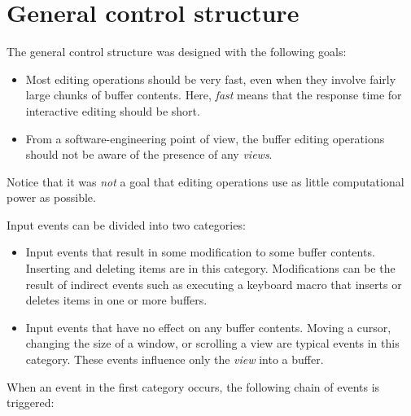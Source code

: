 \chapter{General control structure}
\label{chap-internals-control-structure}

The general control structure was designed with the following goals: 

\begin{itemize}
\item Most editing operations should be very fast, even when they
  involve fairly large chunks of buffer contents.  Here, \emph{fast}
  means that the response time for interactive editing should be
  short. 
\item From a software-engineering point of view, the buffer editing
  operations should not be aware of the presence of any \emph{views}. 
\end{itemize}

Notice that it was \emph{not} a goal that editing operations use as
little computational power as possible.  

Input events can be divided into two categories:

\begin{itemize}
\item Input events that result in some modification to some buffer
  contents.  Inserting and deleting items are in this category.
  Modifications can be the result of indirect events such as executing
  a keyboard macro that inserts or deletes items in one or more
  buffers. 
\item Input events that have no effect on any buffer contents.  Moving
  a cursor, changing the size of a window, or scrolling a view are
  typical events in this category.  These events influence only the
  \emph{view} into a buffer.
\end{itemize}

When an event in the first category occurs, the following chain of
events is triggered:

